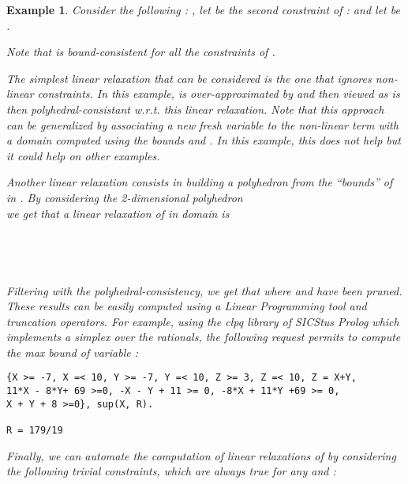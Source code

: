 \documentclass[submission,copyright,creativecommons]{eptcs}
\newtheorem{example}{Example}
\begin{document}
\begin{example}
Consider the following : , let  be the second constraint of : 
and let  be .

\noindent
Note that  is bound-consistent for all the constraints of .

\noindent
The simplest linear relaxation that can be considered is the one that ignores non-linear constraints.
In this example,  is over-approximated by   and then  viewed as  
 is then
polyhedral-consistant w.r.t. this linear relaxation. Note that this approach can be generalized by
associating a new fresh variable to the non-linear term  with a domain computed using the
bounds  and . In this example, this does not help but it could help on other examples.

\noindent
Another linear relaxation consists in building a polyhedron from the ``bounds'' of 
in . By considering the 2-dimensional 
polyhedron\\ 
 we get that a linear relaxation of  in
domain  is\\ 
\\
\\
\\
\\  
Filtering with the polyhedral-consistency, we get that
 where  and  have been pruned.
These results can be easily computed using a Linear Programming tool and truncation operators. For example,
using the clpq library of SICStus Prolog which implements
a simplex over the rationals, the following request permits to compute the max bound of variable :
\begin{verbatim} 
{X >= -7, X =< 10, Y >= -7, Y =< 10, Z >= 3, Z =< 10, Z = X+Y, 
11*X - 8*Y+ 69 >=0, -X - Y + 11 >= 0, -8*X + 11*Y +69 >= 0, 
X + Y + 8 >=0}, sup(X, R).

R = 179/19   \end{verbatim}

Finally, we can automate the computation of linear relaxations of 
by considering the following trivial constraints, which are always true for
any  and :
\\
\\
\\
\\


\end{example}
\end{document}
